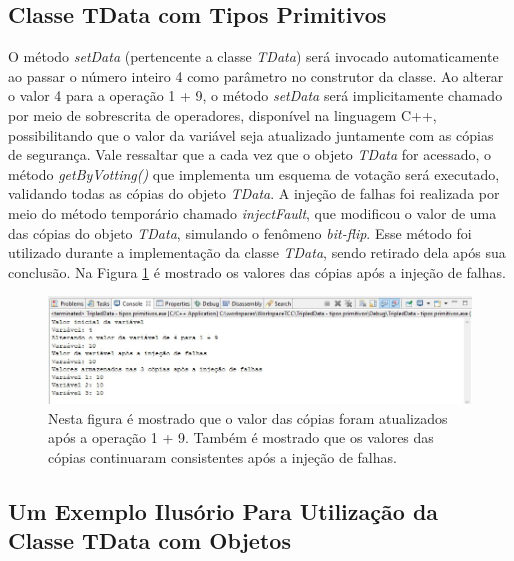 \subsection{Classe TData com Tipos Primitivos} \label{subsec:TDataPrimitivo}

O método \textit{setData} (pertencente a classe \textit{TData}) será invocado automaticamente ao passar o número inteiro 4 como parâmetro no construtor da classe. Ao alterar o valor 4 para a operação 1 + 9, o método \textit{setData} será implicitamente chamado por meio de sobrescrita de operadores, disponível na linguagem C++, possibilitando que o valor da variável seja atualizado juntamente com as cópias de segurança. Vale ressaltar que a cada vez que o objeto \textit{TData} for acessado, o método \textit{getByVotting()} que implementa um esquema de votação será executado, validando todas as cópias do objeto \textit{TData}. A injeção de falhas foi realizada por meio do método temporário chamado \textit{injectFault}, que modificou o valor de uma das cópias do objeto \textit{TData}, simulando o fenômeno \textit{bit-flip}. Esse método foi utilizado durante a implementação da classe \textit{TData}, sendo retirado dela após sua conclusão. Na Figura \ref{Img:tdataPrimitivo} é mostrado os valores das cópias após a injeção de falhas.

\begin{figure}[H]
	\centering
	\includegraphics[width=1.0\textwidth]{figuras/tdataPrimitivo.jpg}
	\caption[Figura que apresenta a saída com os valores das cópias consistentes para tipos primitivos após a injeção de falhas.]{Nesta figura é mostrado que o valor das cópias foram atualizados após a operação 1 + 9. Também é mostrado que os valores das cópias continuaram consistentes após a injeção de falhas.}
	\label{Img:tdataPrimitivo}	
\end{figure}	


\subsection{Um Exemplo Ilusório Para Utilização da Classe TData com Objetos} \label{subsec:exemploTData}

